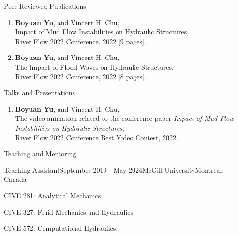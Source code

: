 \documentclass{resume} %
\begin{document}
\begin{rSection}{Peer-Reviewed Publications}
\begin{enumerate}
	\item \textbf{Boyuan Yu}, and Vincent H. Chu,\\
	Impact of Mud Flow Instabilities on Hydraulic Structures,\\
	River Flow 2022 Conference, 2022 [9 pages].
	
	\item \textbf{Boyuan Yu}, and Vincent H. Chu,\\
	The Impact of Flood Waves on Hydraulic Structures,\\
	River Flow 2022 Conference, 2022 [8 pages].

\end{enumerate}

\end{rSection}

\begin{rSection}{Talks and Presentations}
\begin{enumerate}
	\item \textbf{Boyuan Yu}, and Vincent H. Chu,\\
	The video animation related to the conference paper \textit{Impact of Mud Flow Instabilities on Hydraulic Structures},\\
	River Flow 2022 Conference Best Video Contest, 2022.
\end{enumerate}
	
\end{rSection}	


\begin{rSection}{Teaching and Mentoring}

    \begin{rSubsection}{Teaching Assistant}{September 2019 - May 2024}{McGill University}{Montreal, Canada}
        \item CIVE 281: Analytical Mechanics.
        \item CIVE 327: Fluid Mechanics and Hydraulics.
        \item CIVE 572: Computational Hydraulics.
    \end{rSubsection}

\end{rSection}
\end{document}
